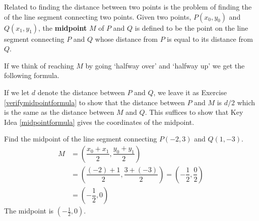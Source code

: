 
\medskip

Related to finding the distance between two points is the problem of finding the   of the line segment connecting two points.  Given two points, $P\left(x_{0}, y_{0}\right)$ and $Q\left(x_{1}, y_{1}\right)$, the \textbf{midpoint} $M$  of $P$ and $Q$ is defined to be the point on the line segment connecting $P$ and $Q$ whose distance from $P$ is equal to its distance from  $Q$.  


If we think of reaching $M$ by going `halfway over' and `halfway up' we get the following formula. 

\medskip


\medskip

If we let $d$ denote the distance between $P$ and $Q$, we leave it as Exercise \ref{verifymidpointformula} to show that the distance between $P$ and $M$ is $d/2$ which is the same as the distance between $M$ and $Q$.  This suffices to show that Key Idea \ref{midpointformula} gives the coordinates of the midpoint.

\medskip

{
Find the midpoint of the line segment connecting $P(-2,3)$ and  $Q(1,-3)$.  
}
{
\begin{align*}
 M & = \left( \dfrac{x_{0}+x_{1}}{2},  \dfrac{y_{0}+y_{1}}{2} \right) \\
   & = \left( \dfrac{(-2)+1}{2},  \dfrac{3+(-3)}{2} \right)  = \left(- \dfrac{1}{2}, \dfrac{0}{2} \right) \\
   & = \left(- \dfrac{1}{2}, 0 \right) 
\end{align*}
The midpoint is  $\left(- \frac{1}{2}, 0 \right)$.}

